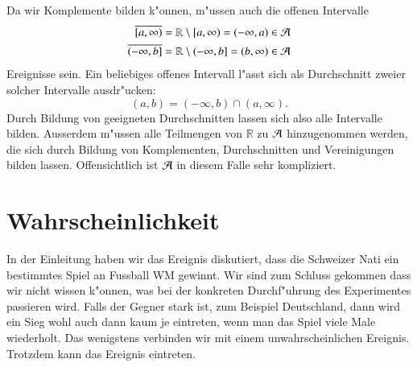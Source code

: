 Da wir Komplemente bilden k"onnen, m"ussen auch die offenen Intervalle
\begin{align*}
\overline{[a,\infty)}&=\mathbb R\setminus [a,\infty)=(-\infty,a)\in\cal A\\
\overline{(-\infty,b]}&=\mathbb R\setminus (-\infty,b]= (b,\infty)\in\cal A
\end{align*}
Ereignisse sein. Ein beliebiges offenes Intervall l"asst sich
als Durchschnitt zweier solcher Intervalle ausdr"ucken:
\[
(a,b)=(-\infty, b)\cap(a,\infty).
\]
Durch Bildung von geeigneten Durchschnitten lassen sich also alle
Intervalle bilden. Ausserdem m"ussen alle Teilmengen von $\mathbb R$
zu $\cal A$ hinzugenommen werden, die sich durch Bildung von Komplementen,
Durchschnitten und Vereinigungen bilden lassen. Offensichtlich ist $\cal A$
in diesem Falle sehr kompliziert.

\section{Wahrscheinlichkeit} \label{section-wahrscheinlichkeit}
In der Einleitung haben wir das Ereignis diskutiert, dass die Schweizer
Nati ein bestimmtes Spiel an Fussball WM gewinnt.
Wir sind zum Schluss
gekommen dass wir nicht wissen k"onnen, was bei der konkreten
Durchf"uhrung des Experimentes passieren wird.
Falls der Gegner
stark ist, zum Beispiel Deutschland, dann wird ein Sieg wohl auch
dann kaum je eintreten, wenn man das Spiel viele Male wiederholt.
Das wenigstens verbinden wir mit einem unwahrscheinlichen Ereignis.
Trotzdem kann das Ereignis eintreten.

